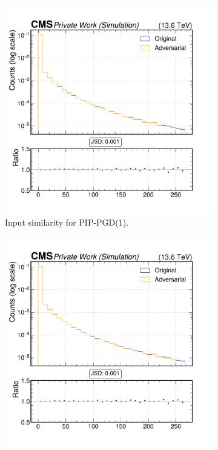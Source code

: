 \begin{figure}[h]
  \centering
  \begin{subfigure}[t]{0.32\textwidth}
    \includegraphics[width=\linewidth]{media/output/features/compare/combined_it_1/cmp_vtx_arr_sv_d3dsig.pdf}
    \caption*{Input similarity for PIP-PGD(1).}
  \end{subfigure}\hfill
  \begin{subfigure}[t]{0.32\textwidth}
    \includegraphics[width=\linewidth]{media/output/features/compare/combined_it_2/cmp_vtx_arr_sv_d3dsig.pdf}

\end{subfigure}
\end{figure}
